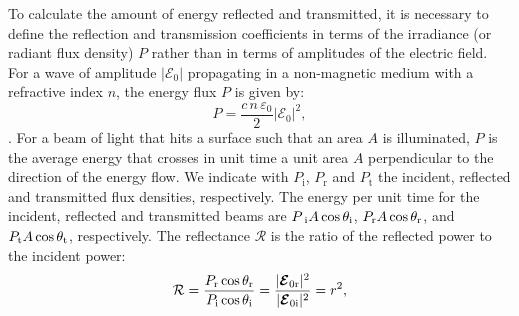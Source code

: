 \indent To calculate the amount of energy reflected and transmitted, it is necessary to define the reflection and transmission coefficients in terms of the irradiance (or radiant flux density) $P$ rather than in terms of amplitudes of the electric field. For a wave of amplitude $|\boldsymbol{\mathcal{E}}_0|$ propagating in a non-magnetic medium with a refractive index $n$, the energy flux $P$ is given by:
\begin{equation}
P = \frac{c\, n \, \varepsilon_0}{2}|\boldsymbol{\mathcal{E}}_0|^2,
\end{equation}
\cite{hecht1998hecht}. For a beam of light that hits a surface such that an area $A$ is illuminated,
$P$ is the average energy that crosses in unit time a unit area $A$ perpendicular to the direction of the energy flow.
We indicate with $P_{\textrm{i}}$, $P_{\textrm{r}}$ and $P_{\textrm{t}}$ the incident, reflected and transmitted flux densities, respectively.
The energy per unit time for the incident, reflected and transmitted beams are 
$P_\textrm{
i} A\cos\theta_\textrm{i}$, $P_\textrm{r} A\cos\theta_\textrm{r}$, and 
$P_\textrm{t} A\cos\theta_\textrm{t}$, respectively. %
The reflectance $\mathcal{R}$ is the ratio of the reflected power to the incident power:
\begin{equation}\label{reflectance}
\mathcal{R} = \frac{P_\textrm{r}\cos\theta_\textrm{r}}{P_\textrm{i}\cos\theta_\textrm{i}} = \frac{|\boldsymbol{\mathcal{E}}_{0 \textrm{r}}|^2}{|\boldsymbol{\mathcal{E}}_{0 \textrm{i}}|^2} = r^2,
\end{equation}
